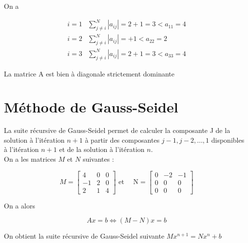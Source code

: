 \documentclass[10pt]{article}
\begin{document}
On a

\[
\begin{array}{ll}
i=1 & \sum_{j \neq i}^{N}\left|a_{i j}\right|=2+1=3<a_{11}=4 \\
i=2 & \sum_{j \neq i}^{N}\left|a_{i j}\right|=+1<a_{22}=2 \\
i=3 & \sum_{j \neq i}^{N}\left|a_{i j}\right|=2+1=3<a_{33}=4
\end{array}
\]

La matrice A est bien à diagonale strictement dominante

\section*{Méthode de Gauss-Seidel}
La suite récursive de Gauss-Seidel permet de calculer la composante J de la solution à l'itération \(n+1\) à partir des composantes \(j-1, j-2, \ldots, 1\) disponibles à l'itération \(n+1\) et de la solution à l'itération \(n\).\\
On a les matrices \(M\) et \(N\) suivantes :

\[
M=\left[\begin{array}{ccc}
4 & 0 & 0 \\
-1 & 2 & 0 \\
2 & 1 & 4
\end{array}\right] \text { et } \quad \mathrm{N}=\left[\begin{array}{ccc}
0 & -2 & -1 \\
0 & 0 & 0 \\
0 & 0 & 0
\end{array}\right]
\]

On a alors

\[
A x=b \Leftrightarrow(M-N) x=b
\]

On obtient la suite récursive de Gauss-Seidel suivante \(M x^{n+1}=N x^{n}+b\)
\end{document}
